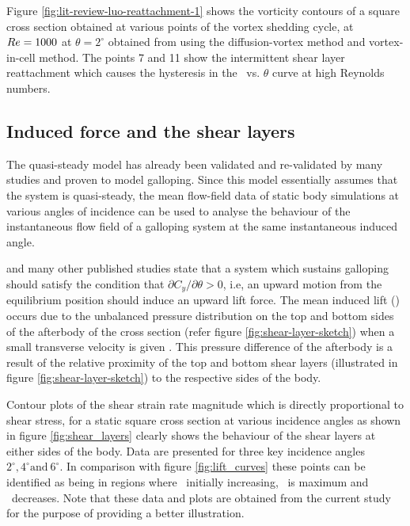

Figure \ref{fig:lit-review-luo-reattachment-1} shows the vorticity contours of a square cross section obtained at various points of the vortex shedding cycle, at $Re=1000$ at $\theta=2^{\circ}$ obtained from \citet{Luo2003}using the  diffusion-vortex method and vortex-in-cell method. The points 7 and 11 show the intermittent shear layer reattachment which causes the hysteresis in the \cy\ vs. $\theta$ curve at high Reynolds numbers.

\vspace{20mm}   

\subsection{Induced force and the shear layers}
\label{subsec:c_y and shear layers}

 The quasi-steady model has already been validated and re-validated by many studies \citep{Parkinson1964,Barrero-Gil2009,Luo2003} and proven to model galloping. Since this model essentially assumes that the system is quasi-steady, the mean flow-field data of static body simulations at various angles of incidence can be used to analyse the behaviour of the instantaneous flow field of a galloping system at the same instantaneous induced angle. 
 
 





\citet{Paidoussis2010,Parkinson1964,Barrero-Gil2010a} and many other published studies state that a system which sustains galloping should satisfy the condition that $\partial C_y/\partial \theta>0$, i.e, an upward motion from the equilibrium position should induce an upward lift force. The mean induced lift (\cy) occurs due to the unbalanced pressure distribution on the top and bottom sides of the afterbody of the cross section (refer figure \ref{fig:shear-layer-sketch}) when a small transverse velocity is given \citep{Parkinson1989}. This pressure difference of the afterbody is a result of the relative proximity of the top and bottom shear layers (illustrated in figure \ref{fig:shear-layer-sketch}) to the respective sides of the body. 

Contour plots of the shear strain rate magnitude which is directly proportional to shear stress, for a static square cross section at various incidence angles as shown in figure \ref{fig:shear_layers} clearly shows the behaviour of the shear layers at either sides of the body. Data are presented for three key incidence angles $2^{\circ}, 4^{\circ} \text{and}\ 6^{\circ}$. In comparison with figure \ref{fig:lift_curves} these points can be identified as being in regions where \cy\ initially increasing, \cy\ is maximum and \cy\ decreases. Note that these data and plots are obtained from the current study for the purpose of providing a better illustration.

